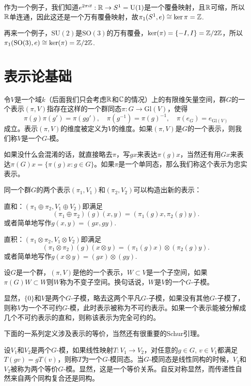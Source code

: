 作为一个例子，我们知道$e^{2\pi it}:\mathbb{R}\to S^1=\mathrm{U}(1)$是一个覆叠映射，且$\mathbb{R}$可缩，所以$\mathbb{R}$单连通，因此这还是一个万有覆叠映射，故$\pi_1(S^1,e)\cong \ker{\pi}=\mathbb{Z}$.

再来一个例子，$\mathrm{SU}(2)$是$\mathrm{SO}(3)$的万有覆叠，$\ker(\pi)=\{-I,I\}=\mathbb{Z}/2\mathbb{Z}$，所以$\pi_1(\mathrm{SO}(3),e)\cong \ker(\pi)=\mathbb{Z}/2\mathbb{Z}$.


\chapter{表示论基础}

\begin{para}
令$V$是一个域$k$（后面我们只会考虑$\mathbb{R}$和$\mathbb{C}$的情况）上的有限维矢量空间，群$G$的一个表示$(\pi, V)$指存在这样的一个群同态$\pi:G\rightarrow \mathrm{Gl}(V)$，使得
\[
	\pi(g)\pi(g')=\pi(gg'),\quad \pi(g^{-1})=\pi(g)^{-1},\quad \pi(e_G)=e_{\mathrm{Gl}(V)}
\]
成立。表示$(\pi, V)$的维度被定义为$V$的维度。如果$(\pi, V)$是$G$的一个表示，则我们称$V$是一个$G$-模。
\end{para}

如果没什么会混淆的话，就直接略去$\pi$，写$gx$来表达$\pi(g)x$，当然还有用$Gx$来表达$\pi(G)x=\{\pi(g)x:g\in G\}$。如果$\pi$是一个单同态，那么我们称这个表示为忠实表示。

\para 同一个群$G$的两个表示$(\pi_1,V_1)$和$(\pi_2,V_2)$可以构造出新的表示：

 直和：$(\pi_1\oplus \pi_2,V_1\oplus V_2)$即满足
\[
	(\pi_1\oplus \pi_2)(g)(x,y)=(\pi_1(g)x,\pi_2(g)y).
\]
或者简单地写作$g(x,y)=(gx,gy)$.

 直积：$(\pi_1\otimes \pi_2,V_1\otimes V_2)$即满足
\[
	(\pi_1\otimes \pi_2)(g)(x\otimes y)=(\pi_1(g)x)\otimes (\pi_2(g)y).
\]
或者简单地写作$g(x\otimes y)=(gx)\otimes(gy)$.

\begin{para}
设$G$是一个群，$(\pi,V)$是他的一个表示，$W\subset V$是一个子空间，如果$\pi(G)W\subset W$则$W$称为不变子空间。换句话说，$W$是$V$的一个$G$-子模。

显然，$\{0\}$和$V$是两个$G$-子模，略去这两个平凡$G$-子模，如果没有其他$G$-子模了，则称$V$为一个不可约$G$-模，此时表示被称为不可约表示。如果一个表示能被分解成几个不可约表示的直和，则称该表示为完全可约的。
\end{para}

下面的一系列定义涉及表示的等价，当然还有很重要的Schur引理。

\begin{para}
设$V_1$和$V_2$是两个$G$-模，如果线性映射$T:V_1\to V_2$，对任意的$g\in G$, $v\in V_1$都满足$T(gv)=gT(v)$，则称$T$为一个$G$-模同态。当$G$-模同态是线性同构的时候，$V_1$和$V_2$被称为两个等价$G$-模。显然，这是一个等价关系。自反对称显然，而传递性自然来自两个同构复合还是同构。
\end{para}

